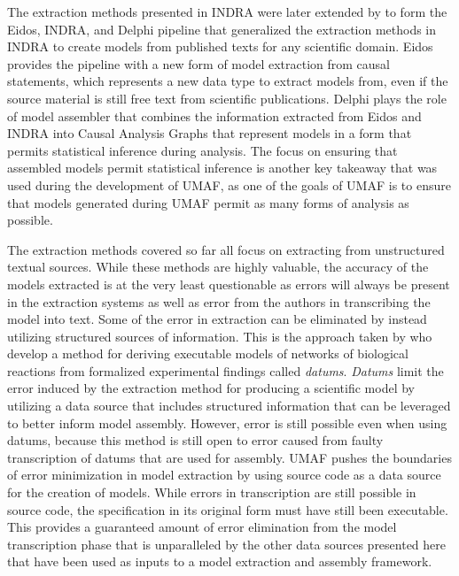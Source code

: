 The extraction methods presented in INDRA were later extended by \citet{EidosIndraDelphi} to form the Eidos, INDRA, and Delphi pipeline that generalized the extraction methods in INDRA to create models from published texts for any scientific domain.
Eidos provides the pipeline with a new form of model extraction from causal statements, which represents a new data type to extract models from, even if the source material is still free text from scientific publications.
Delphi plays the role of model assembler that combines the information extracted from Eidos and INDRA into Causal Analysis Graphs that represent models in a form that permits statistical inference during analysis.
The focus on ensuring that assembled models permit statistical inference is another key takeaway that was used during the development of UMAF, as one of the goals of UMAF is to ensure that models generated during UMAF permit as many forms of analysis as possible.

The extraction methods covered so far all focus on extracting from unstructured textual sources.
While these methods are highly valuable, the accuracy of the models extracted is at the very least questionable as errors will always be present in the extraction systems as well as error from the authors in transcribing the model into text.
Some of the error in extraction can be eliminated by instead utilizing structured sources of information.
This is the approach taken by \citet{nigam2015datums} who develop a method for deriving executable models of networks of biological reactions from formalized experimental findings called \textit{datums}.
\textit{Datums} limit the error induced by the extraction method for producing a scientific model by utilizing a data source that includes structured information that can be leveraged to better inform model assembly.
However, error is still possible even when using datums, because this method is still open to error caused from faulty transcription of datums that are used for assembly.
UMAF pushes the boundaries of error minimization in model extraction by using source code as a data source for the creation of models.
While errors in transcription are still possible in source code, the specification in its original form must have still been executable.
This provides a guaranteed amount of error elimination from the model transcription phase that is unparalleled by the other data sources presented here that have been used as inputs to a model extraction and assembly framework.
